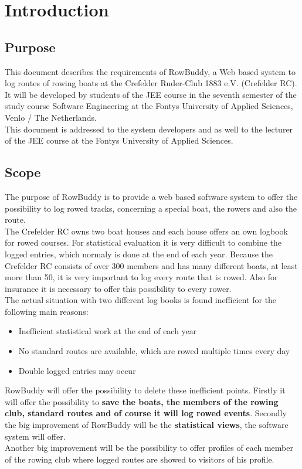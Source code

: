 \section{Introduction}

	\subsection{Purpose}
	This document describes the requirements of RowBuddy, a Web based system to log routes of rowing boats at the Crefelder Ruder-Club 1883 e.V. (Crefelder RC). It will be developed by students of the JEE course in the seventh semester of the study course Software Engineering at the Fontys University of Applied Sciences, Venlo / The Netherlands.\\
	
	This document is addressed to the system developers and as well to the lecturer of the JEE course at the Fontys University of Applied Sciences.
	
	
	\subsection{Scope}
	\label{scope}
	The purpose of RowBuddy is to provide a web based software system to offer the possibility to log rowed tracks, concerning a special boat, the rowers and also the route.\\
	
	The Crefelder RC owns two boat houses and each house offers an own logbook for rowed courses. For statistical evaluation it is very difficult to combine the logged entries, which normaly is done at the end of each year. Because the Crefelder RC consists of over 300 members and has many different boats, at least more than 50, it is very important to log every route that is rowed. Also for insurance it is necessary to offer this possibility to every rower.\\
	
	The actual situation with two different log books is found inefficient for the following main reasons:
	\begin{itemize}
		\item Inefficient statistical work at the end of each year
		\item No standard routes are available, which are rowed multiple times every day
		\item Double logged entries may occur
	\end{itemize}
	
	RowBuddy will offer the possibility to delete these inefficient points. Firstly it will offer the possibility to \textbf{save the boats, the members of the rowing club, standard routes and of course it will log rowed events}. Secondly the big improvement of RowBuddy will be the \textbf{statistical views}, the software system will offer.\\
	Another big improvement will be the possibility to offer profiles of each member of the rowing club where logged routes are showed to visitors of his profile.\\
	
